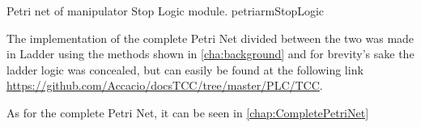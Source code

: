 


\newpage

{Petri net of manipulator Stop Logic module.}
{petriarmStopLogic}

\newpage




The implementation of the complete Petri Net divided between the two \PLCs was
made in Ladder using the methods shown in \autoref{cha:background}  and for
brevity's sake the ladder logic was concealed, but can easily be
found at the following link
\url{https://github.com/Accacio/docsTCC/tree/master/PLC/TCC}.

As for the
complete Petri Net, it can be seen in \autoref{chap:CompletePetriNet} 

